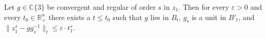 Let $g \in \mathbb{C}\{3\}$ be convergent and regular of order $s$ in $z_1$. Then for every $\varepsilon > 0$ and every $t_0 \in \mathbb{R}_+^n$ there exists a $t \leqslant t_0$ such that $g$ lies in $B_t$, $g_s$ is a unit in $B'_t$, and $\|z_1^s - gg_s^{-1}\|_t \leqslant \varepsilon \cdot t_1^s$.
